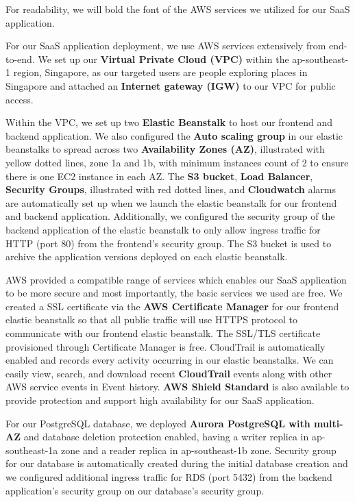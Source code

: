 \documentclass[12pt,a4paper]{article}
\begin{document}
        For readability, we will bold the font of the AWS services we utilized for our SaaS application.

        For our SaaS application deployment, we use AWS services extensively from end-to-end. We set up our \textbf{Virtual Private Cloud (VPC)} within the ap-southeast-1 region, Singapore, as our targeted users are people exploring places in Singapore and attached an \textbf{Internet gateway (IGW)} to our VPC for public access.
        
        Within the VPC, we set up two \textbf{Elastic Beanstalk} to host our frontend and backend application. We also configured the \textbf{Auto scaling group} in our elastic beanstalks to spread across two \textbf{Availability Zones (AZ)}, illustrated with yellow dotted lines, zone 1a and 1b, with minimum instances count of 2 to ensure there is one EC2 instance in each AZ. The \textbf{S3 bucket}, \textbf{Load Balancer}, \textbf{Security Groups}, illustrated with red dotted lines, and \textbf{Cloudwatch} alarms are automatically set up when we launch the elastic beanstalk for our frontend and backend application. Additionally, we configured the security group of the backend application of the elastic beanstalk to only allow ingress traffic for HTTP (port 80) from the frontend’s security group. The S3 bucket is used to archive the application versions deployed on each elastic beanstalk.
        
        AWS provided a compatible range of services which enables our SaaS application to be more secure and most importantly, the basic services we used are free. We created a SSL certificate via the \textbf{AWS Certificate Manager} for our frontend elastic beanstalk so that all public traffic will use HTTPS protocol to communicate with our frontend elastic beanstalk. The SSL/TLS certificate provisioned through Certificate Manager is free. CloudTrail is automatically enabled and records every activity occurring in our elastic beanstalks. We can easily view, search, and download recent \textbf{CloudTrail} events along with other AWS service events in Event history. \textbf{AWS Shield Standard} is also available to provide protection and support high availability for our SaaS application. 
        
        For our PostgreSQL database, we deployed \textbf{Aurora PostgreSQL with multi-AZ} and database deletion protection enabled, having a writer replica in ap-southeast-1a zone and a  reader replica in ap-southeast-1b zone. Security group for our database is automatically created during the initial database creation and we configured additional ingress traffic for RDS (port 5432) from the backend application’s security group on our database’s security group. 
        
\end{document}

